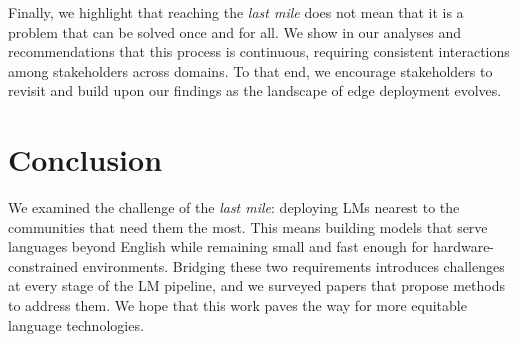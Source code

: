 \documentclass[11pt,a4paper]{article}
\begin{document}
Finally, we highlight that reaching the \textit{last mile} does not mean that it is a problem that can be solved once and for all.
We show in our analyses and recommendations that this process is continuous, requiring consistent interactions among stakeholders across domains.
To that end, we encourage stakeholders to revisit and build upon our findings as the landscape of edge deployment evolves.






\section{Conclusion}

We examined the challenge of the \textit{last mile}: deploying LMs nearest to the communities that need them the most.
This means building models that serve languages beyond English while remaining small and fast enough for hardware-constrained environments.
Bridging these two requirements introduces challenges at every stage of the LM pipeline, and we surveyed \numpapers{} papers that propose methods to address them.
We hope that this work paves the way for more equitable language technologies.


\iftaclpubformat
\end{document}

